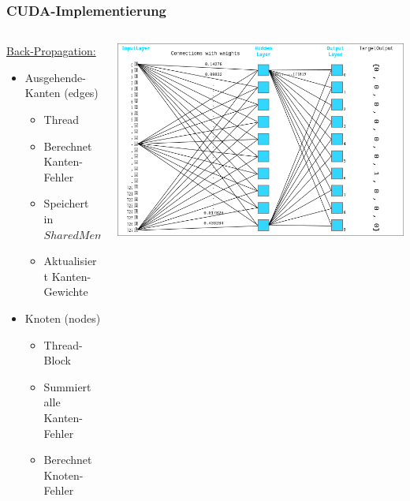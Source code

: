 \documentclass[xcolor=pdftex,dvipsnames,table]{beamer}
\begin{document}
	\begin{frame}
		\frametitle{CUDA-Implementierung}
		\begin{columns}
			\begin{column}{0.5\textwidth}
				\underline{Back-Propagation:}
				\begin{itemize}
					\item Ausgehende-Kanten (edges)
					\begin{itemize}
						\item Thread
						\item Berechnet Kanten-Fehler
						\item Speichert in $Shared Memory$
						\item Aktualisiert Kanten-Gewichte
					\end{itemize}
					\item Knoten (nodes)
					\begin{itemize}
						\item Thread-Block
						\item Summiert alle Kanten-Fehler
						\item Berechnet Knoten-Fehler
					\end{itemize}
				\end{itemize}
			\end{column}
			\begin{column}{0.6\textwidth}
				\includegraphics[width=1\textwidth]{nn.png}
			\end{column}
		\end{columns}
	\end{frame}
\end{document}
